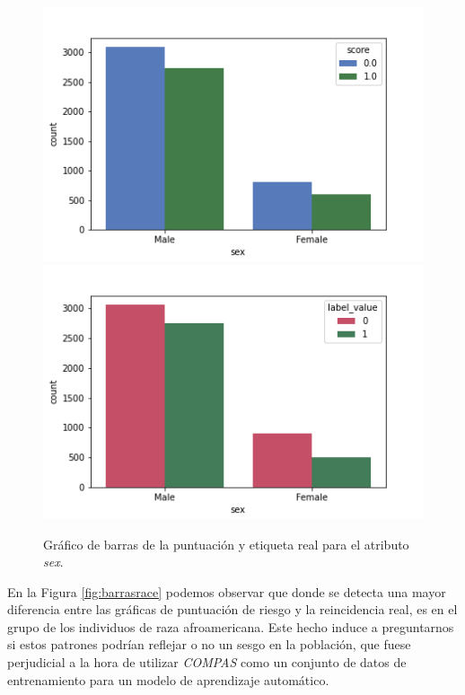 \begin{figure}[h]
      \includegraphics[width=\linewidth]{images/score_sex.png}
    \endminipage\hfill
      \includegraphics[width=\linewidth]{images/label_sex.png}
    \endminipage
     \caption{Gráfico de barras de la puntuación y etiqueta real para el atributo \textit{sex}.}
     \label{fig:barrassex}
\end{figure}

En la Figura \ref{fig:barrasrace} podemos observar que donde se detecta una mayor diferencia entre las gráficas de puntuación de riesgo y la reincidencia real, es en el grupo de los individuos de raza afroamericana. Este hecho induce a preguntarnos si estos patrones podrían reflejar o no un sesgo en la población, que fuese perjudicial a la hora de utilizar \textit{COMPAS} como un conjunto de datos de entrenamiento para un modelo de aprendizaje automático.

